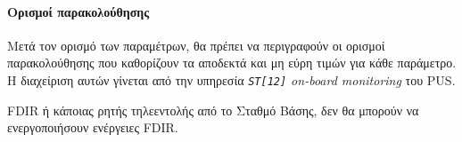 \documentclass[a4paper,nobib]{tufte-book}
\begin{document}
\paragraph{Ορισμοί παρακολούθησης}

Μετά τον ορισμό των παραμέτρων, θα πρέπει να περιγραφούν οι ορισμοί παρακολούθησης που καθορίζουν τα αποδεκτά και μη εύρη τιμών για κάθε παράμετρο. Η διαχείριση αυτών γίνεται από την υπηρεσία \emph{\texttt{ST[12]} on-board monitoring} του \ac{PUS}.

  \ac{FDIR} ή κάποιας ρητής τηλεεντολής από το Σταθμό Βάσης, δεν θα μπορούν να ενεργοποιήσουν ενέργειες \ac{FDIR}.
\end{document}
